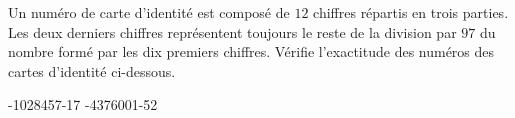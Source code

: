 %
%
Un numéro de carte d'identité est composé de $12$ chiffres répartis en trois parties. Les deux derniers chiffres représentent toujours le reste de la division par $97$ du nombre formé par les dix premiers chiffres. Vérifie l'exactitude des numéros des cartes d'identité ci-dessous.
    \begin{tasks}
        -1028457-17
        -4376001-52
    \end{tasks}
